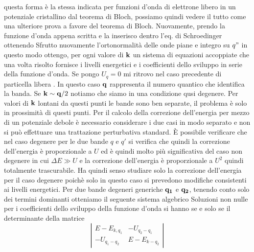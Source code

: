 \documentclass[a4paper,12pt]{article}
\begin{document}
questa forma è la stessa indicata per funzioni d'onda di elettrone libero in un potenziale cristallino dal teorema di Bloch, possiamo quindi vedere il tutto come una ulteriore prova a favore del teorema di Bloch. Nuovamente, prendo la funzione d'onda appena scritta e la inserisco dentro l'eq. di Schroedinger ottenendo
Sfrutto nuovamente l'ortonormalità delle onde piane e integro su $q"$ in questo modo ottengo, per ogni valore di $\it\bf k$ un sistema di equazioni accoppiate
che una volta risolto fornisce i livelli energetici e i coefficienti dello sviluppo in serie della funzione d'onda. Se pongo $U_q=0$ mi ritrovo nel caso precedente di particella libera
.
In questo caso $\it\bf q$ rappresenta il numero quantico che identifica la banda. Se ${\it\bf k} \sim {\it\bf q} /2$ notiamo che siamo in una condizione qusi degenere. Per valori di $\it\bf k$ lontani da questi punti le bande sono ben separate, il problema è solo in prossimità di questi punti. Per il calcolo della correzione dell'energia per mezzo di un potenziale debole è necessario considerare i due casi in modo separato e non si può effettuare una trattazione perturbativa standard. \`E possibile verificare che nel caso degenere per le due bande $q$ e $q'$ si verifica che 
quindi la correzione dell'energia è proporzionale a $U$ ed è quindi molto più significativa del caso non degenere in cui $\Delta E\gg U$ e la correzione dell'energia è proporzionale a $U^2$ quindi totalmente trascurabile. Ha quindi senso studiare solo la correzione dell'energia per il caso degenere poichè solo in questo caso si prevedono modifiche consistenti ai livelli energetici.
Per due bande degeneri generiche $\it\bf q_1$ e $\it\bf q_2$, tenendo conto solo dei termini dominanti otteniamo il seguente sistema algebrico
Soluzioni non nulle per i coefficienti dello sviluppo della funzione d'onda si hanno se e solo se il determinante della matrice
\[ \left| \begin{array}{cc}
E-E_{k,q_1} & -U_{q_2-q_1}  \\
-U_{q_1-q_2} & E-E_{k-q_2} \end{array} \right|\]
\end{document}
